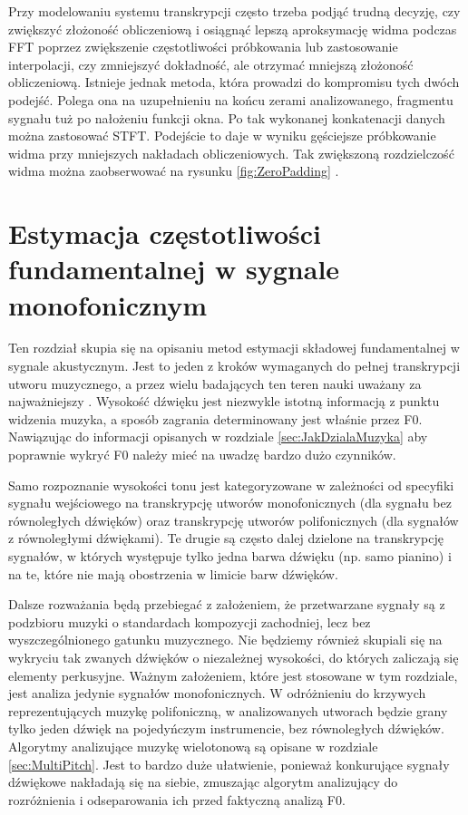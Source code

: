 \documentclass[12pt,a4paper,twoside]{mwart}
\begin{document}
Przy modelowaniu systemu transkrypcji często trzeba podjąć trudną decyzję, czy zwiększyć złożoność obliczeniową i osiągnąć lepszą aproksymację widma podczas FFT poprzez zwiększenie częstotliwości próbkowania lub zastosowanie interpolacji, czy zmniejszyć dokładność, ale otrzymać mniejszą złożoność obliczeniową. Istnieje jednak metoda, która prowadzi do kompromisu tych dwóch podejść. Polega ona na uzupełnieniu na końcu zerami analizowanego, fragmentu sygnału tuż po nałożeniu funkcji okna. Po tak wykonanej konkatenacji danych można zastosować STFT. Podejście to daje w wyniku gęściejsze próbkowanie widma przy mniejszych nakładach obliczeniowych. Tak zwiększoną rozdzielczość widma można zaobserwować na rysunku \ref{fig:ZeroPadding} \cite[221-224]{CyfrowePrzetwarzanieSygnalowOdTeoriiDoZastosowan}.

\clearpage

\section{Estymacja częstotliwości fundamentalnej w sygnale monofonicznym}\label{sec:f0}
Ten rozdział skupia się na opisaniu metod estymacji składowej fundamentalnej w sygnale akustycznym. Jest to jeden z kroków wymaganych do pełnej transkrypcji utworu muzycznego, a przez wielu badających ten teren nauki uważany za najważniejszy  \cite[2-4]{Transcription:Klapuri:ChallengesAndFuture}. Wysokość dźwięku jest niezwykle istotną informacją z punktu widzenia muzyka, a sposób zagrania determinowany jest właśnie przez F0. Nawiązując do informacji opisanych w rozdziale \ref{sec:JakDzialaMuzyka} aby poprawnie wykryć F0 należy mieć na uwadzę bardzo dużo czynników. 

Samo rozpoznanie wysokości tonu jest kategoryzowane w zależności od specyfiki sygnału wejściowego na transkrypcję utworów monofonicznych (dla sygnału bez równoległych dźwięków) oraz transkrypcję utworów polifonicznych (dla sygnałów z równoległymi dźwiękami). Te drugie są często dalej dzielone na transkrypcję sygnałów, w których występuje tylko jedna barwa dźwięku (np. samo pianino) i na te, które nie mają obostrzenia w limicie barw dźwięków.

Dalsze rozważania będą przebiegać z założeniem, że przetwarzane sygnały są z podzbioru muzyki o standardach kompozycji zachodniej, lecz bez wyszczególnionego gatunku muzycznego. Nie będziemy również skupiali się na wykryciu tak zwanych dźwięków o niezależnej wysokości, do których zaliczają się elementy perkusyjne. Ważnym założeniem, które jest stosowane w tym rozdziale, jest analiza jedynie sygnałów monofonicznych. W odróżnieniu do krzywych reprezentujących muzykę polifoniczną, w analizowanych utworach będzie grany tylko jeden dźwięk na pojedyńczym instrumencie, bez równoległych dźwięków. Algorytmy analizujące muzykę wielotonową są opisane w rozdziale \ref{sec:MultiPitch}. Jest to bardzo duże ułatwienie, ponieważ konkurujące sygnały dźwiękowe nakładają się na siebie, zmuszając algorytm analizujący do rozróżnienia i odseparowania ich przed faktyczną analizą F0. 
\end{document}

